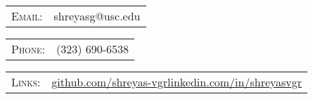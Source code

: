 \begin{tabular}{rl}
\textsc{Email:} & shreyasg@usc.edu\\
\end{tabular}
\hfill
\begin{tabular}{rl}
\textsc{\hspace{2.0cm}Phone:} & (323) 690-6538\\
\end{tabular}
%
\begin{tabular}{rl}
\textsc{Links:} & \href{http://github.com/shreyas-vgr}{github.com/shreyas-vgr}\hspace{8.1cm}\href{http://www.linkedin.com/in/shreyasvgr}{linkedin.com/in/shreyasvgr}
\end{tabular}
\vspace{5pt}
